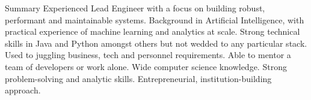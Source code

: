 \documentclass{resume} %
\begin{document}

\begin{rSection}{Summary}
Experienced Lead Engineer with a focus on building robust, performant and maintainable systems. Background in Artificial Intelligence, with practical experience of machine learning and analytics at scale. Strong technical skills in Java and Python amongst others but not wedded to any particular stack. Used to juggling business, tech and personnel requirements. Able to mentor a team of developers or work alone. Wide computer science knowledge. Strong problem-solving and analytic skills. Entrepreneurial, institution-building approach.
\end{rSection}

\end{document}

